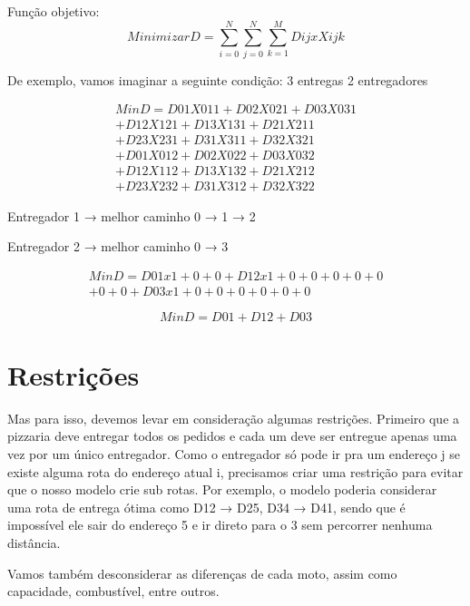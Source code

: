 \documentclass[12pt]{article}
\begin{document}
Função objetivo:
$$
Minimizar D = \sum_{i=0}^N \sum_{j=0}^N \sum_{k=1}^M Dij x Xijk
$$

De exemplo, vamos imaginar a seguinte condição:
3 entregas
2 entregadores

\begin{align*}
Min D = D01X011 + D02X021 + D03X031 
\\ + D12X121 + D13X131 + D21X211 
\\ + D23X231 + D31X311 + D32X321
\\ + D01X012 + D02X022 + D03X032 
\\ + D12X112 + D13X132  + D21X212 
\\ + D23X232 + D31X312 + D32X322
\end{align*}

Entregador 1 → melhor caminho 0 → 1 → 2

Entregador 2 → melhor caminho 0 → 3

\begin{align*}
Min D = D01x1 + 0 + 0 + D12x1 + 0 + 0 + 0 + 0 + 0
\\ + 0 + 0 + D03x1 + 0 + 0 + 0 + 0 + 0 + 0
\end{align*}

$$
Min D = D01 + D12 + D03
$$

\section{Restrições}

Mas para isso, devemos levar em consideração algumas restrições. Primeiro que a pizzaria deve entregar todos os pedidos e cada um deve ser entregue apenas uma vez por um único entregador. Como o entregador só pode ir pra um endereço j se existe alguma rota do endereço atual i, precisamos criar uma restrição para evitar que o nosso modelo crie sub rotas. Por exemplo, o modelo poderia considerar uma rota de entrega ótima como D12 → D25, D34 → D41, sendo que é impossível ele sair do endereço 5 e ir direto para o 3 sem percorrer nenhuma distância. 

Vamos também desconsiderar as diferenças de cada moto, assim como capacidade, combustível, entre outros.
\end{document}
